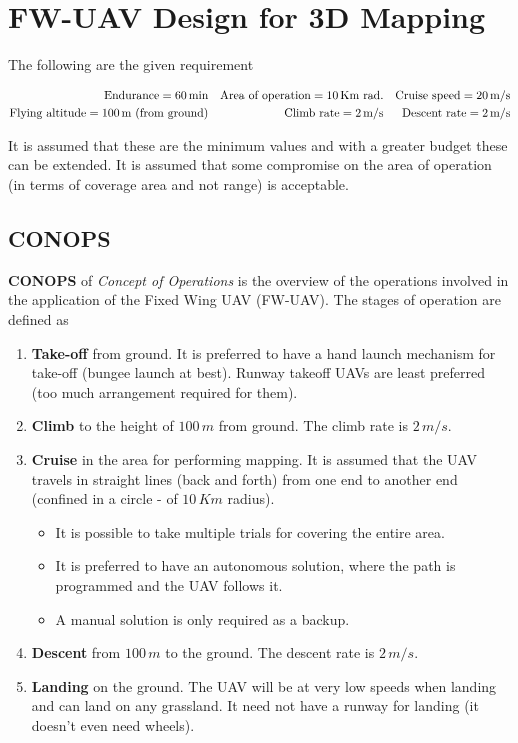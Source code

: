 \section{FW-UAV Design for 3D Mapping}

The following are the given requirement

\begin{align*}
    \textup{Endurance} = 60 \, \textup{min} &&
    \textup{Area of operation} = 10 \, \textup{Km rad.} &&
    \textup{Cruise speed} = 20 \, \textup{m/s} \\
    \textup{Flying altitude} = 100 \, \textup{m (from ground)} &&
    \textup{Climb rate} = 2 \, \textup{m/s} &&
    \textup{Descent rate} = 2 \, \textup{m/s}
\end{align*}

It is assumed that these are the minimum values and with a greater budget these can be extended. It is assumed that some compromise on the area of operation (in terms of coverage area and not range) is acceptable.

\subsection{CONOPS}

\textbf{CONOPS} of \emph{Concept of Operations} is the overview of the operations involved in the application of the Fixed Wing UAV (FW-UAV). The stages of operation are defined as

\begin{enumerate}
    \item \textbf{Take-off} from ground. It is preferred to have a hand launch mechanism for take-off (bungee launch at best). Runway takeoff UAVs are least preferred (too much arrangement required for them).
    \item \textbf{Climb} to the height of $100 \, m$ from ground. The climb rate is $2 \, m/s$.
    \item \textbf{Cruise} in the area for performing mapping. It is assumed that the UAV travels in straight lines (back and forth) from one end to another end (confined in a circle - of $10\, Km$ radius).
    \begin{itemize}
        \item It is possible to take multiple trials for covering the entire area.
        \item It is preferred to have an autonomous solution, where the path is programmed and the UAV follows it.
        \item A manual solution is only required as a backup.
    \end{itemize}
    \item \textbf{Descent} from $100\, m$ to the ground. The descent rate is $2 \, m/s$.
    \item \textbf{Landing} on the ground. The UAV will be at very low speeds when landing and can land on any grassland. It need not have a runway for landing (it doesn't even need wheels).
\end{enumerate}

